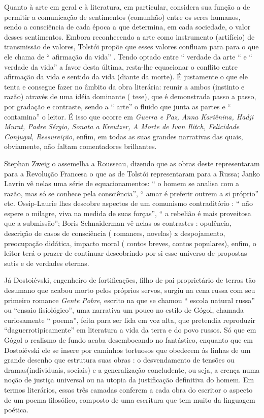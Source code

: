 Quanto à arte em geral e à literatura, em particular, considera sua
função a de permitir a comunicação de sentimentos (comunhão) entre os
seres humanos, sendo a consciência de cada época a que determina, em
cada sociedade, o valor desses sentimentos. Embora reconhecendo a arte
como instrumento (artifício) de transmissão de valores, Tolstói propõe
que esses valores confluam para para o que ele chama de `` afirmação da
vida'' . Tendo optado entre `` verdade da arte `` e `` verdade da vida''
a favor desta última, resta-lhe equacionar o conflito entre afirmação da
vida e sentido da vida (diante da morte). É justamente o que ele tenta e
consegue fazer no âmbito da obra literária: reunir a ambos (instinto e
razão) através de uma idéia dominante ( tese), que é demonstrada passo a
passo, por gradação e contraste, sendo a `` arte'' o fluido que junta as
partes e `` contamina'' o leitor. É isso que ocorre em \emph{Guerra e
Paz, Anna Kariênina, Hadji Murat, Padre Sérgio, Sonata a Kreutzer, A
Morte de Ivan Ilitch, Felicidade Conjugal, Ressureição}, enfim, em todas
as suas grandes narrativas das quais, obviamente, não faltam
comentadores brilhantes.

Stephan Zweig o assemelha a Rousseau, dizendo que as obras deste
representaram para a Revolução Francesa o que as de Tolstói
representaram para a Russa; Janko Lavrin vê nelas uma série de
equacionamentos: `` o homem se analisa com a razão, mas só se conhece
pela consciência'', `` amar é preferir outrem a si próprio'' etc.
Ossip-Laurie lhes descobre aspectos de um comunismo contraditório : ``
não espere o milagre, viva na medida de suas forças'', `` a rebelião é
mais proveitosa que a submissão''; Boris Schnaiderman vê nelas os
contrastes : opulência, descrição de casos de consciência ( romances,
novelas) x despojamento, preocupação didática, impacto moral ( contos
breves, contos populares), enfim, o leitor terá o prazer de continuar
descobrindo por si esse universo de propostas sutis e de verdades
eternas.

Já Dostoiévski, engenheiro de fortificações, filho de pai proprietário
de terras tão desumano que acabou morto pelos próprios servos, surgiu na
cena russa com seu primeiro romance \emph{Gente Pobre,} escrito na que
se chamou `` escola natural russa'' ou ``ensaio fisiológico'', uma
narrativa um pouco no estilo de Gógol, chamada curiosamente `` poema'',
feita para ser lida em voz alta, que pretendia reproduzir
``daguerrotipicamente'' em literatura a vida da terra e do povo russos.
Só que em Gógol o realismo de fundo acaba desembocando no fantástico,
enquanto que em Dostoiévski ele se insere por caminhos tortuosos que
obedecem às linhas de um grande desenho que estrutura suas obras : o
desvendamento de tensões ou dramas(individuais, sociais) e a
generalização concludente, ou seja, a crença numa noção de justiça
universal ou na utopia da justificação definitiva do homem. Em termos
literários, essas três camadas conferem a cada obra do escritor o
aspecto de um poema filosófico, composto de uma escritura que tem muito
da linguagem poética.

